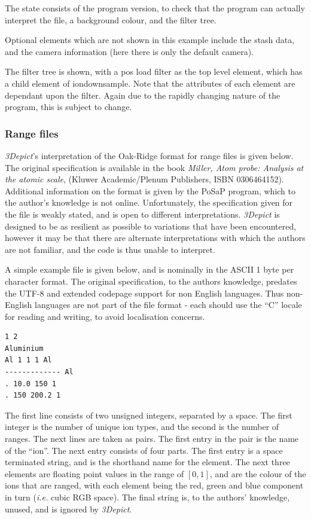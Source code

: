 \documentclass[10pt]{article}
\begin{document}
The state consists of the program version, to check that the program can actually interpret the file, a background colour, and the filter tree. 

Optional elements which are not shown in this example include the stash data, and the camera information (here there is only the default camera).

The filter tree is shown, with a pos load filter as the top level element, which has a child element of iondownsample. Note that the attributes of each element are dependant upon the filter. Again due to the rapidly changing nature of the program, this is subject to change.

\subsubsection{Range files}
\label{sec:rangeFormat}
\emph{3Depict}'s interpretation of the Oak-Ridge format for range files is given below. The original specification is available in the book \textit{Miller, Atom probe: Analysis at the atomic scale}, (Kluwer Academic/Plenum Publishers, ISBN 0306464152). Additional information on the format is given by the PoSaP program, which to the author's knowledge is not online. Unfortunately, the specification given for the file is weakly stated, and is open to different interpretations. \emph{3Depict} is designed to be as resilient as possible to variations that have been encountered, however it may be that there are alternate interpretations with which the authors are not familiar, and the code is thus unable to interpret.

A simple example file is given below, and is nominally in the ASCII 1 byte per character format. The original specification, to the authors knowledge, predates the UTF-8 and extended codepage support for non English languages. Thus non-English languages are not part of the file format - each should use the ``C'' locale for reading and writing, to avoid localisation concerns.

\begin{verbatim}
1 2
Aluminium
Al 1 1 1 Al
------------- Al
. 10.0 150 1
. 150 200.2 1
\end{verbatim}


The first line consists of two unsigned integers, separated by a space. The first integer is the number of unique ion types, and the second is the number of ranges. The next lines are taken as pairs. The first entry in the pair is the name of the ``ion''. The next entry consists of four parts. The first entry is a space terminated string, and is the shorthand name for the element. The next three elements are floating point values in the range of $[0,1]$, and are the colour of the ions that are ranged, with each element being the red, green and blue component in turn (\emph{i.e.} cubic RGB space). The final string is, to the authors' knowledge, unused, and is ignored by \emph{3Depict}. 
\end{document}
